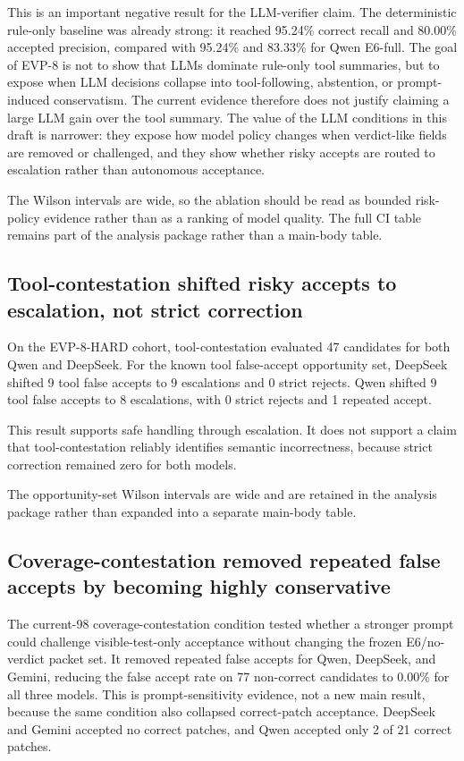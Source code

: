 \documentclass[conference]{IEEEtran}
\begin{document}
This is an important negative result for the LLM-verifier claim. The deterministic rule-only baseline was already strong: it reached 95.24\% correct recall and 80.00\% accepted precision, compared with 95.24\% and 83.33\% for Qwen E6-full. The goal of EVP-8 is not to show that LLMs dominate rule-only tool summaries, but to expose when LLM decisions collapse into tool-following, abstention, or prompt-induced conservatism. The current evidence therefore does not justify claiming a large LLM gain over the tool summary. The value of the LLM conditions in this draft is narrower: they expose how model policy changes when verdict-like fields are removed or challenged, and they show whether risky accepts are routed to escalation rather than autonomous acceptance.

The Wilson intervals are wide, so the ablation should be read as bounded risk-policy evidence rather than as a ranking of model quality. The full CI table remains part of the analysis package rather than a main-body table.

\subsection{Tool-contestation shifted risky accepts to escalation, not strict correction}

On the EVP-8-HARD cohort, tool-contestation evaluated 47 candidates for both Qwen and DeepSeek. For the known tool false-accept opportunity set, DeepSeek shifted 9 tool false accepts to 9 escalations and 0 strict rejects. Qwen shifted 9 tool false accepts to 8 escalations, with 0 strict rejects and 1 repeated accept.

This result supports safe handling through escalation. It does not support a claim that tool-contestation reliably identifies semantic incorrectness, because strict correction remained zero for both models.

The opportunity-set Wilson intervals are wide and are retained in the analysis package rather than expanded into a separate main-body table.

\subsection{Coverage-contestation removed repeated false accepts by becoming highly conservative}

The current-98 coverage-contestation condition tested whether a stronger prompt could challenge visible-test-only acceptance without changing the frozen E6/no-verdict packet set. It removed repeated false accepts for Qwen, DeepSeek, and Gemini, reducing the false accept rate on 77 non-correct candidates to 0.00\% for all three models. This is prompt-sensitivity evidence, not a new main result, because the same condition also collapsed correct-patch acceptance. DeepSeek and Gemini accepted no correct patches, and Qwen accepted only 2 of 21 correct patches.
\end{document}
